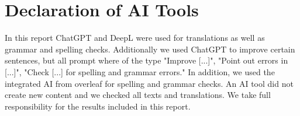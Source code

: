 \chapter{Declaration of AI Tools}

In this report ChatGPT and DeepL were used for translations as well as grammar and spelling checks. Additionally we used ChatGPT to improve certain sentences, but all prompt where of the type
"Improve [...]", "Point out errors in [...]", "Check [...] for spelling and grammar errors." In addition, we used the integrated AI from overleaf for spelling and grammar checks. An AI tool did not create new content and we checked all texts and translations. We take full responsibility for the results included in this report.
